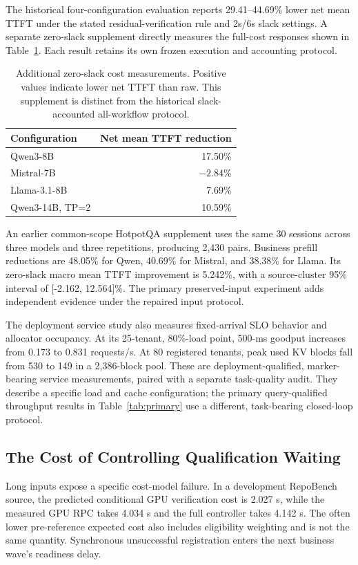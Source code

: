 The historical four-configuration evaluation reports 29.41--44.69\% lower net mean TTFT under the stated residual-verification rule and 2s/6s slack settings. A separate zero-slack supplement directly measures the full-cost responses shown in Table~\ref{tab:zeroslack}. Each result retains its own frozen execution and accounting protocol.

\begin{table}[t]
\centering\small
\caption{Additional zero-slack cost measurements. Positive values indicate lower net TTFT than raw. This supplement is distinct from the historical slack-accounted all-workflow protocol.}
\label{tab:zeroslack}
\begin{tabular}{@{}lr@{}}
\toprule
Configuration & Net mean TTFT reduction\\
\midrule
Qwen3-8B & 17.50\%\\
Mistral-7B & $-2.84$\%\\
Llama-3.1-8B & 7.69\%\\
Qwen3-14B, TP=2 & 10.59\%\\
\bottomrule
\end{tabular}
\end{table}

An earlier common-scope HotpotQA supplement uses the same 30 sessions across three models and three repetitions, producing 2,430 pairs. Business prefill reductions are 48.05\% for Qwen, 40.69\% for Mistral, and 38.38\% for Llama. Its zero-slack macro mean TTFT improvement is 5.242\%, with a source-cluster 95\% interval of [-2.162, 12.564]\%. The primary preserved-input experiment adds independent evidence under the repaired input protocol.

The deployment service study also measures fixed-arrival SLO behavior and allocator occupancy. At its 25-tenant, 80\%-load point, 500-ms goodput increases from 0.173 to 0.831 requests/s. At 80 registered tenants, peak used KV blocks fall from 530 to 149 in a 2,386-block pool. These are deployment-qualified, marker-bearing service measurements, paired with a separate task-quality audit. They describe a specific load and cache configuration; the primary query-qualified throughput results in Table~\ref{tab:primary} use a different, task-bearing closed-loop protocol.

\subsection{The Cost of Controlling Qualification Waiting}
\label{sec:costvariant}
Long inputs expose a specific cost-model failure. In a development RepoBench source, the predicted conditional GPU verification cost is 2.027 s, while the measured GPU RPC takes 4.034 s and the full controller takes 4.142 s. The often lower pre-reference expected cost also includes eligibility weighting and is not the same quantity. Synchronous unsuccessful registration enters the next business wave's readiness delay.

